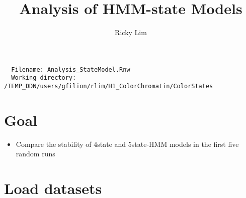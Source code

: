 \documentclass{article}\usepackage{graphicx, color}
\begin{document}
\author{Ricky Lim}
\title{Analysis of HMM-state Models}
\maketitle

\begin{verbatim}
  Filename: Analysis_StateModel.Rnw 
  Working directory: /TEMP_DDN/users/gfilion/rlim/H1_ColorChromatin/ColorStates 
\end{verbatim}

\section{Goal}

\begin{itemize}
  \item Compare the stability of 4state and 5state-HMM models in the first five random runs
\end{itemize}

\section{Load datasets}
\end{document}
